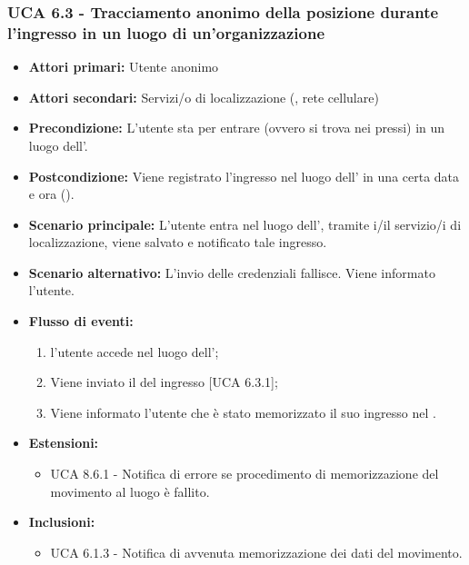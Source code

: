 \subsubsection{UCA 6.3 - Tracciamento anonimo della posizione durante l'ingresso in un luogo di un'organizzazione}
\begin{itemize}
	\item \textbf{Attori primari:} Utente anonimo
	\item \textbf{Attori secondari:} Servizi/o di localizzazione (, rete cellulare)
	\item \textbf{Precondizione:} L'utente sta per entrare (ovvero si trova nei pressi) in un luogo dell'.
	\item \textbf{Postcondizione:} Viene registrato l'ingresso nel luogo dell' in una certa data e ora ().
	\item \textbf{Scenario principale:} L'utente entra nel luogo dell', tramite i/il servizio/i di localizzazione, viene salvato e notificato tale ingresso.
	\item \textbf{Scenario alternativo:} L'invio delle credenziali fallisce. Viene informato l'utente.
	\item \textbf{Flusso di eventi:}
	\begin{enumerate}
		\item l'utente accede nel luogo dell';
		\item Viene inviato il  del ingresso [UCA 6.3.1];
		\item Viene informato l'utente che è stato memorizzato il suo ingresso nel .
	\end{enumerate}
	\item \textbf{Estensioni:}
	\begin{itemize}
		\item UCA 8.6.1 - Notifica di errore se procedimento di memorizzazione del movimento al luogo è fallito.
	\end{itemize}
	\item \textbf{Inclusioni:}
	\begin{itemize}
		\item UCA 6.1.3 - Notifica di avvenuta memorizzazione dei dati del movimento.
	\end{itemize}
\end{itemize}

